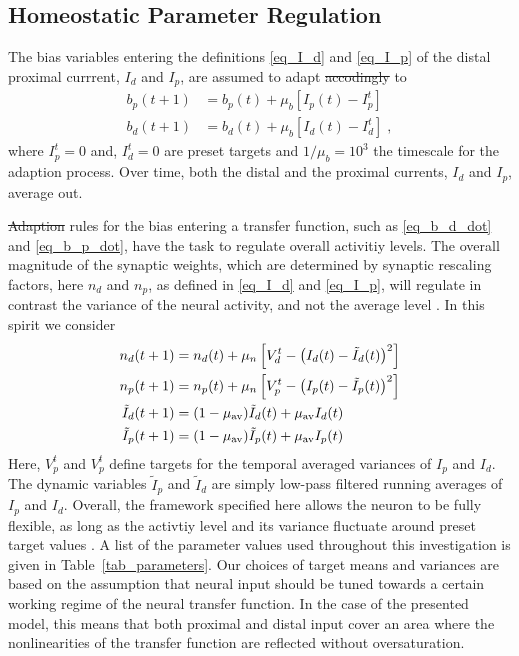 \documentclass[utf8]{frontiersSCNS} %
\providecommand{\DIFaddtex}[1]{{\protect\color{blue}\uwave{#1}}} %
\providecommand{\DIFdeltex}[1]{{\protect\color{red}\sout{#1}}}                      %
\providecommand{\DIFaddbegin}{} %
\providecommand{\DIFaddend}{} %
\providecommand{\DIFdelbegin}{} %
\providecommand{\DIFdelend}{} %
\providecommand{\DIFadd}[1]{\texorpdfstring{\DIFaddtex{#1}}{#1}} %
\providecommand{\DIFdel}[1]{\texorpdfstring{\DIFdeltex{#1}}{}} %
\begin{document}
\subsection{Homeostatic Parameter Regulation\label{sect_homeostasis}}

The bias variables entering the definitions
\eqref{eq_I_d} and \eqref{eq_I_p} of the distal
proximal currrent, $I_d$ and $I_p$, 
are assumed to adapt \DIFdelbegin \DIFdel{accodingly }\DIFdelend \DIFaddbegin \DIFadd{according }\DIFaddend to
\begin{align}
\label{eq_b_p_dot}
b_p(t+1) &= b_p(t) + \mu_b \left[I_p(t) - I_p^t\right] \\
b_d(t+1) &= b_d(t) + \mu_b \left[I_d(t) - I_d^t\right] \;,
\label{eq_b_d_dot}
\end{align}
where $I_p^t=0$ and, $I_d^t=0$
are preset targets and $1/\mu_b=10^3$ the
timescale for the adaption process. Over
time, both the distal and the proximal 
currents, $I_d$ and $I_p$, average out.

\DIFdelbegin \DIFdel{Adaption }\DIFdelend \DIFaddbegin \DIFadd{Adaptation }\DIFaddend rules for the bias entering a 
transfer function, such as
\eqref{eq_b_d_dot} and \eqref{eq_b_p_dot},
have the task to regulate overall activitiy
levels. The overall magnitude of the
synaptic weights, which are determined by 
synaptic rescaling factors, here $n_d$ and $n_p$, 
as defined in \eqref{eq_I_d} and \eqref{eq_I_p},
will regulate in contrast the variance of
the neural activity, and not the average
level \citep{schubert2021local}. In this
spirit we consider
\begin{align}
n_d(t+1) &= n_d(t) + 
\mu_n \left[V_d^t - \left( I_d(t) - \tilde{I}_d(t)\right)^2\right] \\
n_p(t+1) &= n_p(t) + 
\mu_n \left[V_p^t - \left( I_p(t) - \tilde{I}_p(t)\right)^2\right] \\
\tilde{I}_d(t+1) &= (1-\mu_{\rm av})\tilde{I}_d(t) + \mu_{\rm av} I_d(t) \\
\tilde{I}_p(t+1) &= (1-\mu_{\rm av})\tilde{I}_p(t) + \mu_{\rm av} I_p(t) 
\end{align}
Here, $V_p^t$ and $V_p^t$ define targets for 
the temporal averaged variances of $I_p$ 
and $I_d$.  
The dynamic variables $\tilde{I}_p$ and $\tilde{I}_d$ 
are simply low-pass filtered running averages of 
$I_p$ and $I_d$. Overall, the framework
specified here allows the neuron to be fully flexible,
as long as the activtiy level and its variance 
fluctuate around preset target values 
\citep{schubert2021local}. A list of 
the parameter values used throughout this investigation 
is \DIFaddbegin \DIFadd{also }\DIFaddend given in Table~\ref{tab_parameters}. Our choices of
target means and variances are based on the assumption
that neural input should be tuned towards a certain
working regime of the neural transfer function. In
the case of the presented model, this means that both
proximal and distal input cover an area where the nonlinearities
of the transfer function are reflected without oversaturation.
\end{document}
